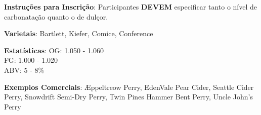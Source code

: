 \textbf{Instruções para Inscrição}: Participantes \textbf{DEVEM} especificar tanto o nível de carbonatação quanto o de dulçor.

\textbf{Varietais}: Bartlett, Kiefer, Comice, Conference

\textbf{Estatísticas}: OG: 1.050 - 1.060 \\
\phantom{ } \hspace{16.5mm} FG: 1.000 - 1.020 \\
\phantom{ } \hspace{16.5mm} ABV: 5 - 8\%

\textbf{Exemplos Comerciais}: Æppeltreow Perry, EdenVale Pear Cider, Seattle Cider Perry, Snowdrift Semi-Dry Perry, Twin Pines Hammer Bent Perry, Uncle John's Perry

